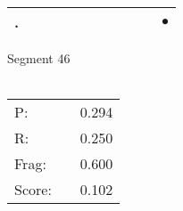 \documentclass[landscape]{article}
\newcommand{\ssp}{\hspace{2pt}}
\newcommand{\mex}{\cellcolor{g}$\bullet$}
\begin{document}
\begin{tabular}{|l|p{10pt}|p{10pt}|p{10pt}|p{10pt}|p{10pt}|p{10pt}|p{10pt}|p{10pt}|p{10pt}|p{10pt}|}
\hline
\ssp \cellcolor{ref9}. \ssp&\hspace{2pt}&\hspace{2pt}&\hspace{2pt}&\hspace{2pt}&\hspace{2pt}&\hspace{2pt}&\hspace{2pt}&\hspace{2pt}&\hspace{2pt}&\hspace{2pt}\mex\\
\hline
\end{tabular}

\vspace{6pt}
\noindent Segment 46\\\\
\noindent\begin{tabular}{lm{12pt}r}
\hline
P:&&0.294\\
R:&&0.250\\
Frag:&&0.600\\
Score:&&0.102\\
\end{tabular}

\newpage
\end{document}
